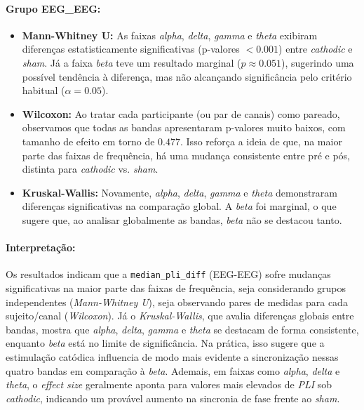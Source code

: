 \paragraph{Grupo EEG\_EEG:}
\begin{itemize}
    \item \textbf{Mann-Whitney U:} As faixas \emph{alpha}, \emph{delta}, \emph{gamma} e \emph{theta} exibiram diferenças estatisticamente significativas (p-valores $< 0.001$) entre \emph{cathodic} e \emph{sham}. Já a faixa \emph{beta} teve um resultado marginal ($p \approx 0.051$), sugerindo uma possível tendência à diferença, mas não alcançando significância pelo critério habitual ($\alpha=0.05$).
    \item \textbf{Wilcoxon:} Ao tratar cada participante (ou par de canais) como pareado, observamos que todas as bandas apresentaram p-valores muito baixos, com tamanho de efeito em torno de $0.477$. Isso reforça a ideia de que, na maior parte das faixas de frequência, há uma mudança consistente entre pré e pós, distinta para \emph{cathodic} vs. \emph{sham}.
    \item \textbf{Kruskal-Wallis:} Novamente, \emph{alpha}, \emph{delta}, \emph{gamma} e \emph{theta} demonstraram diferenças significativas na comparação global. A \emph{beta} foi marginal, o que sugere que, ao analisar globalmente as bandas, \emph{beta} não se destacou tanto.
\end{itemize}

\paragraph{Interpretação:}
Os resultados indicam que a \texttt{median\_pli\_diff} (EEG-EEG) sofre mudanças significativas na maior parte das faixas de frequência, seja considerando grupos independentes (\emph{Mann-Whitney U}), seja observando pares de medidas para cada sujeito/canal (\emph{Wilcoxon}). Já o \emph{Kruskal-Wallis}, que avalia diferenças globais entre bandas, mostra que \emph{alpha}, \emph{delta}, \emph{gamma} e \emph{theta} se destacam de forma consistente, enquanto \emph{beta} está no limite de significância. 
Na prática, isso sugere que a estimulação catódica influencia de modo mais evidente a sincronização nessas quatro bandas em comparação à \emph{beta}. Ademais, em faixas como \emph{alpha}, \emph{delta} e \emph{theta}, o \emph{effect size} geralmente aponta para valores mais elevados de \emph{PLI} sob \emph{cathodic}, indicando um provável aumento na sincronia de fase frente ao \emph{sham}.

